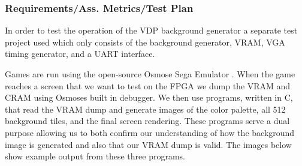 \documentclass{beamer}
\begin{document}
    \begin{frame}
        \frametitle{Requirements/Ass. Metrics/Test Plan}
        In order to test the operation of the VDP background generator a separate test
        project used which only consists of the background generator, VRAM, VGA timing
        generator, and a UART interface.

        Games are run using the open-source Osmose Sega Emulator \cite{osmose}. When
        the game reaches a screen that we want to test on the FPGA we dump the VRAM and
        CRAM using Osmoses built in debugger. We then use programs, written in C, that
        read the VRAM dump and generate images of the color palette, all 512 background
        tiles, and the final screen rendering.  These programs serve a dual purpose
        allowing us to both confirm our understanding of how the background image is
        generated and also that our VRAM dump is valid. The images below show example
        output from these three programs.
    \end{frame}
\end{document}
